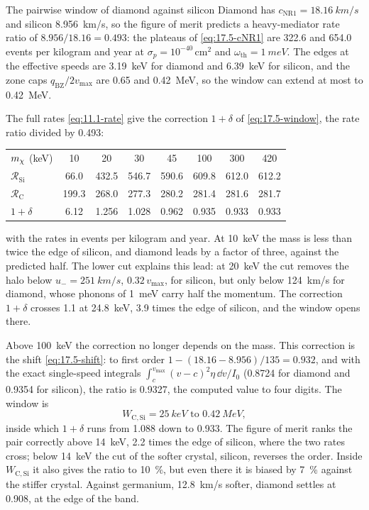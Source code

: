 \begin{workedexample}{The pairwise window of diamond against silicon}\label{we:17-window}
Diamond has $c_{\mathrm{NR1}} = \SI{18.16}{km/s}$ and silicon \SI{8.956}{km/s}, so the figure of merit predicts a heavy-mediator rate ratio of $8.956/18.16 = 0.493$: the plateaus of \cref{eq:17.5-cNR1} are 322.6 and 654.0 events per kilogram and year at $\sigma_p = 10^{-40}\,\mathrm{cm^2}$ and $\omega_{\mathrm{th}} = \SI{1}{meV}$. The edges at the effective speeds are \SI{3.19}{keV} for diamond and \SI{6.39}{keV} for silicon, and the zone caps $q_{\mathrm{BZ}}/2v_{\mathrm{max}}$ are 0.65 and \SI{0.42}{MeV}, so the window can extend at most to \SI{0.42}{MeV}.

The full rates \cref{eq:11.1-rate} give the correction $1 + \delta$ of \cref{eq:17.5-window}, the rate ratio divided by 0.493:
\begin{center}
\small
\begin{tabular}{lccccccc}
\toprule
$m_{\chi}$ (keV) & 10 & 20 & 30 & 45 & 100 & 300 & 420 \\
$\mathcal{R}_{\mathrm{Si}}$ & 66.0 & 432.5 & 546.7 & 590.6 & 609.8 & 612.0 & 612.2 \\
$\mathcal{R}_{\mathrm{C}}$ & 199.3 & 268.0 & 277.3 & 280.2 & 281.4 & 281.6 & 281.7 \\
$1 + \delta$ & 6.12 & 1.256 & 1.028 & 0.962 & 0.935 & 0.933 & 0.933 \\
\bottomrule
\end{tabular}
\end{center}
with the rates in events per kilogram and year. At \SI{10}{keV} the mass is less than twice the edge of silicon, and diamond leads by a factor of three, against the predicted half. The lower cut explains this lead: at \SI{20}{keV} the cut removes the halo below $u_- = \SI{251}{km/s}$, $0.32\,v_{\mathrm{max}}$, for silicon, but only below \SI{124}{km/s} for diamond, whose phonons of \SI{1}{meV} carry half the momentum. The correction $1 + \delta$ crosses 1.1 at \SI{24.8}{keV}, 3.9 times the edge of silicon, and the window opens there.

Above \SI{100}{keV} the correction no longer depends on the mass. This correction is the shift \cref{eq:17.5-shift}: to first order $1 - (18.16 - 8.956)/135 = 0.932$, and with the exact single-speed integrals $\int_c^{v_{\mathrm{max}}}(v - c)^2\eta\,\dd v/I_0$ (0.8724 for diamond and 0.9354 for silicon), the ratio is 0.9327, the computed value to four digits. The window is
\begin{equation*}
  W_{\mathrm{C,Si}} = \SI{25}{keV}\text{ to }\SI{0.42}{MeV} ,
\end{equation*}
inside which $1 + \delta$ runs from 1.088 down to 0.933. The figure of merit ranks the pair correctly above \SI{14}{keV}, 2.2 times the edge of silicon, where the two rates cross; below \SI{14}{keV} the cut of the softer crystal, silicon, reverses the order. Inside $W_{\mathrm{C,Si}}$ it also gives the ratio to \SI{10}{\percent}, but even there it is biased by \SI{7}{\percent} against the stiffer crystal. Against germanium, \SI{12.8}{km/s} softer, diamond settles at 0.908, at the edge of the band.
\end{workedexample}


